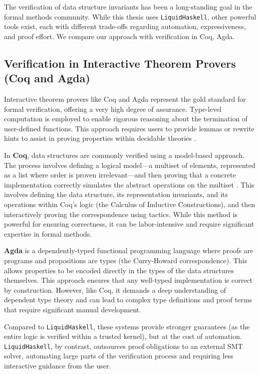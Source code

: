 The verification of data structure invariants has been a long-standing goal in the formal methods community.
While this thesis uses \texttt{LiquidHaskell}, other powerful tools exist, each with different trade-offs regarding automation, expressiveness, and proof effort.
We compare our approach with verification in Coq, Agda.

\subsection{Verification in Interactive Theorem Provers (Coq and Agda)}

Interactive theorem provers like Coq and Agda represent the gold standard for formal verification, offering a very high degree of assurance.
Type-level computation is employed to enable rigorous reasoning about the termination of user-defined functions.
This approach requires users to provide lemmas or rewrite hints to assist in proving properties within decidable theories \cite{vazou2018}.


In \textbf{Coq}, data structures are commonly verified using a model-based approach.
The process involves defining a logical model—a multiset of elements, represented as a list where order is proven irrelevant—and then proving that a concrete implementation correctly simulates the abstract operations on the multiset \cite{VerifiedFunctional}.
This involves defining the data structure, its representation invariants, and its operations within Coq's logic (the Calculus of Inductive Constructions), and then interactively proving the correspondence using tactics.
While this method is powerful for ensuring correctness, it can be labor-intensive and require significant expertise in formal methods.

\textbf{Agda} is a dependently-typed functional programming language where proofs are programs and propositions are types (the Curry-Howard correspondence).
This allows properties to be encoded directly in the types of the data structures themselves.
This approach ensures that any well-typed implementation is correct by construction.
However, like Coq, it demands a deep understanding of dependent type theory and can lead to complex type definitions and proof terms that require significant manual development.

Compared to \texttt{LiquidHaskell}, these systems provide stronger guarantees (as the entire logic is verified within a trusted kernel), but at the cost of automation.
\texttt{LiquidHaskell}, by contrast, outsources proof obligations to an external SMT solver, automating large parts of the verification process and requiring less interactive guidance from the user.
